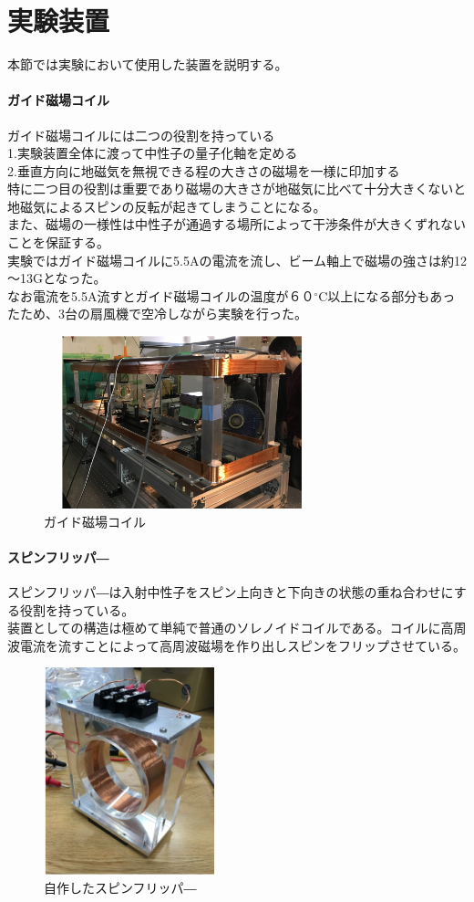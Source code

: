 \begingroup
\section{実験装置}
本節では実験において使用した装置を説明する。
\paragraph{ガイド磁場コイル}
ガイド磁場コイルには二つの役割を持っている\\
1.実験装置全体に渡って中性子の量子化軸を定める\\
2.垂直方向に地磁気を無視できる程の大きさの磁場を一様に印加する\\
特に二つ目の役割は重要であり磁場の大きさが地磁気に比べて十分大きくないと地磁気によるスピンの反転が起きてしまうことになる。\\
また、磁場の一様性は中性子が通過する場所によって干渉条件が大きくずれないことを保証する。\\
実験ではガイド磁場コイルに5.5Aの電流を流し、ビーム軸上で磁場の強さは約12～13Gとなった。\\
なお電流を5.5A流すとガイド磁場コイルの温度が６０$^\circ$C以上になる部分もあったため、3台の扇風機で空冷しながら実験を行った。
\begin{figure}[H]
\centering
\includegraphics[width=8cm,height=5cm]{device/coilphoto.pdf}\caption{ガイド磁場コイル}
\end{figure}
\paragraph{スピンフリッパ―}
スピンフリッパ―は入射中性子をスピン上向きと下向きの状態の重ね合わせにする役割を持っている。\\
装置としての構造は極めて単純で普通のソレノイドコイルである。コイルに高周波電流を流すことによって高周波磁場を作り出しスピンをフリップさせている。
\begin{figure}[H]
\centering
\includegraphics[width=5cm,height=6cm]{device/spinflipperphoto.pdf}\caption{自作したスピンフリッパ―}
\end{figure}
